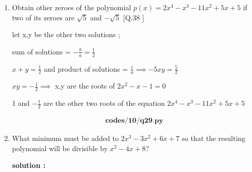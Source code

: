 \begin{enumerate}[label=\thesubsection.\arabic*, ref=\thesubsection.\theenumi]
	\solution 
	

	
	Let the points be $A(7, 10)$, $B(-2, 5)$, and $C(3, -4)$. \\
	Distance formula: $d = \sqrt{(x_2 - x_1)^2 + (y_2 - y_1)^2}$
	
	\begin{align*}
		AB^2 &= (-2 - 7)^2 + (5 - 10)^2 = (-9)^2 + (-5)^2 = 81 + 25 = 106 \\
		BC^2 &= (3 - (-2))^2 + (-4 - 5)^2 = (5)^2 + (-9)^2 = 25 + 81 = 106 \\
		AC^2 &= (3 - 7)^2 + (-4 - 10)^2 = (-4)^2 + (-14)^2 = 16 + 196 = 212
	\end{align*}
	
	Since $AB^2 = BC^2 = 106$, we have $AB = BC = \sqrt{106}$. \\
	Because two sides are equal, $\Delta ABC$ is an isosceles triangle.
	
	3. Verify Right-Angled Property
	Using the converse of Pythagoras' theorem:
	\[
	AB^2 + BC^2 = 106 + 106 = 212 = AC^2
	\]
	Since $AB^2 + BC^2 = AC^2$, $\Delta ABC$ is a right-angled triangle at $B$.
	
	Thus, the given points are the vertices of an isosceles right triangle.
	
	\item  Obtain other zeroes of the polynomial $p(x) = 2x^{4} - x^{3} - 11x^{2} + 5x + 5$ if two of its zeroes are $\sqrt{5}$ and $-\sqrt{5}$
	[Q.38 ]
	
	\solution
	
	let x,y be the other two solutions ;
	
	sum of solutions = $-\frac{b}{a}= \frac{1}{2}$
	
	$x+y=\frac{1}{2}$  and product of solutions = $\frac{e}{a} \implies  -5xy= \frac{5}{2}$
	
	$xy=-\frac{1}{2} \implies$ x,y are the roots of  $ 2x^2-x-1 =0 $
	
	
	1 and $-\frac{1}{2}$ are the other two roots of the equation $2x^4-x^3-11x^2+5x+5$
	
	\begin{align}
		\textbf{codes/10/q29.py}
	\end{align}
	\item 
	
	What minimum must be added to $2x^{3} - 3x^{2} + 6x + 7$ so that the resulting polynomial will be divisible by $x^{2} - 4x + 8$?   
	
	\textbf{solution :}
	

\end{enumerate}
